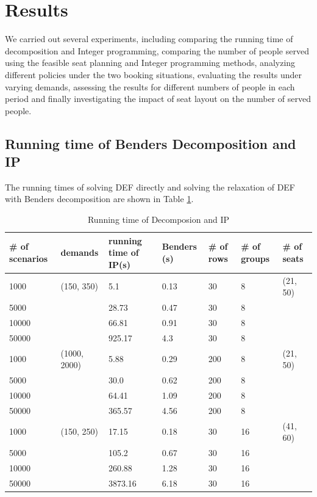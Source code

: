 \section{Results}
We carried out several experiments, including comparing the running time of decomposition and Integer programming, comparing the number of people served using the feasible seat planning and Integer programming methods, analyzing different policies under the two booking situations, evaluating the results under varying demands, assessing the results for different numbers of people in each period and finally investigating the impact of seat layout on the number of served people.


\subsection{Running time of Benders Decomposition and IP}\label{Bender_IP}

The running times of solving DEF directly and solving the relaxation of DEF with Benders decomposition are shown in Table \ref{tab_1}.

\begin{table}[ht]
  \centering
  \caption{Running time of Decomposion and IP}\label{tab_1}
  \begin{tabular}{|l|l|l|l|l|l|l|}
  \hline
  \# of scenarios & demands & running time of IP(s) & Benders (s) & \# of rows & \# of groups & \# of seats\\
  \hline
  1000  & (150, 350) & 5.1  & 0.13 & 30 & 8 & (21, 50)\\
  5000  & & 28.73 & 0.47 & 30 & 8 \\
  10000 & & 66.81  & 0.91 & 30 & 8 \\
  50000 & & 925.17 & 4.3 & 30 & 8 \\
  \hline
  1000  & (1000, 2000) & 5.88 & 0.29 & 200 & 8 & (21, 50)\\
  5000  & & 30.0 & 0.62 & 200 & 8 \\
  10000 & & 64.41 & 1.09 & 200 & 8 \\
  50000 & & 365.57 & 4.56 & 200 & 8 \\
  \hline
  1000  & (150, 250) & 17.15  & 0.18 & 30 & 16 & (41, 60) \\
  5000  & & 105.2  & 0.67 & 30 & 16  \\
  10000 & & 260.88 & 1.28 & 30 & 16  \\
  50000 & & 3873.16 & 6.18 & 30 & 16  \\
  \hline
  \end{tabular}
\end{table}


